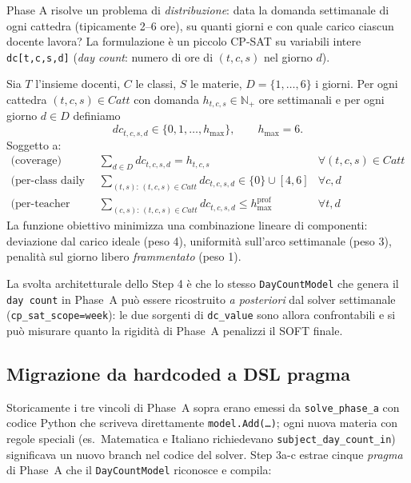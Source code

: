 Phase A risolve un problema di \emph{distribuzione}: data la
domanda settimanale di ogni cattedra (tipicamente 2--6 ore), su
quanti giorni e con quale carico ciascun docente lavora? La
formulazione \`e un piccolo CP-SAT su variabili intere
\texttt{dc[t,c,s,d]} (\emph{day count}: numero di ore di
$(t,c,s)$ nel giorno $d$).

\begin{defbox}[title={Modello \texttt{DayCountModel}}]
Sia $T$ l'insieme docenti, $C$ le classi, $S$ le materie, $D=\{1,\dots,6\}$
i giorni. Per ogni cattedra $(t,c,s) \in \mathit{Catt}$ con
domanda $h_{t,c,s} \in \mathbb{N}_+$ ore settimanali e per ogni
giorno $d \in D$ definiamo
\[
  dc_{t,c,s,d} \in \{0, 1, \dots, h_{\max}\}, \qquad h_{\max} = 6.
\]
Soggetto a:
\begin{align}
\text{(coverage)} \quad & \sum_{d \in D} dc_{t,c,s,d}
  = h_{t,c,s} & \forall (t,c,s) \in \mathit{Catt} \\
\text{(per-class daily load)} \quad & \sum_{(t,s) :\,(t,c,s) \in \mathit{Catt}} dc_{t,c,s,d}
  \in \{0\} \cup [4,6] & \forall c, d \\
\text{(per-teacher daily load)} \quad & \sum_{(c,s) :\,(t,c,s) \in \mathit{Catt}} dc_{t,c,s,d}
  \le h^{\text{prof}}_{\max} & \forall t, d
\end{align}
La funzione obiettivo minimizza una combinazione lineare di
componenti: deviazione dal carico ideale (peso 4), uniformit\`a
sull'arco settimanale (peso 3), penalit\`a sul giorno libero
\emph{frammentato} (peso 1).
\end{defbox}

\begin{ideabox}
La svolta architetturale dello Step 4 \`e che lo stesso
\texttt{DayCountModel} che genera il \texttt{day count} in
Phase~A pu\`o essere ricostruito \emph{a posteriori} dal solver
settimanale (\texttt{cp\_sat\_scope=week}): le due sorgenti di
\texttt{dc\_value} sono allora confrontabili e si pu\`o
misurare quanto la rigidit\`a di Phase~A penalizzi il SOFT
finale.
\end{ideabox}

\subsection{Migrazione da hardcoded a DSL pragma}

Storicamente i tre vincoli di Phase~A sopra erano emessi da
\texttt{solve\_phase\_a} con codice Python che scriveva
direttamente \texttt{model.Add(\dots)}; ogni nuova materia
con regole speciali (es.\ Matematica e Italiano richiedevano
\texttt{subject\_day\_count\_in}) significava un nuovo branch nel
codice del solver. Step 3a-c estrae cinque \emph{pragma} di
Phase~A che il \texttt{DayCountModel} riconosce e compila:

